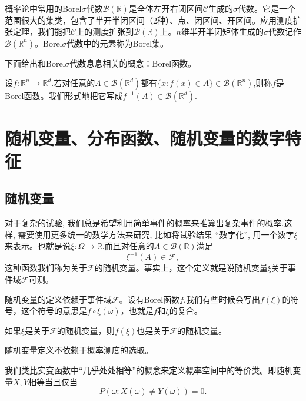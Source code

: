 \documentclass[lang=cn,10pt]{elegantbook}
\begin{document}
	概率论中常用的Borel\(\sigma\)代数\(\mathcal{B}(\mathbb{R})\)是全体左开右闭区间\(\mathcal{C}\)生成的\(\sigma\)代数。它是一个范围很大的集类，包含了半开半闭区间（2种）、点、闭区间、开区间。应用测度扩张定理，我们能把\(\mathcal{C}\)上的测度扩张到\(\mathcal{B}(\mathbb{R})\)上。\(n\)维半开半闭矩体生成的\(\sigma\)代数记作\(\mathcal{B}(\mathbb{R}^n)\)。Borel\(\sigma\)代数中的元素称为Borel集。
	
	下面给出和Borel\(\sigma\)代数息息相关的概念：Borel函数。
	\begin{definition}[Borel函数]
		设\(f:\mathbb{R}^n\to\mathbb{R}^d.\)若对任意的\(A\in\mathcal{B}(\mathbb{R}^d)\)都有\(\{x:f(x)\in A\}\in \mathcal{B}(\mathbb{R}^n)\),则称\(f\)是Borel函数。我们形式地把它写成\(f^{-1}(A)\in \mathcal{B}(\mathbb{R}^d)\).
	\end{definition}
	
	\section{随机变量、分布函数、随机变量的数字特征}
	\subsection{随机变量}
	对于复杂的试验, 我们总是希望利用简单事件的概率来推算出复杂事件的概率.这样, 需要使用更多统一的数学方法来研究, 比如将试验结果 “数字化”, 用一个数字\(\xi\)来表示。也就是说\(\xi:\Omega\to \mathbb{R.}\)而且对任意的\(A\in \mathcal{B}(\mathbb{R})\)满足
	\[\xi^{-1}(A)\in \mathcal{F},\]
	这种函数我们称为关于\(\mathcal{F}\)的随机变量。事实上，这个定义就是说随机变量\(\xi\)关于事件域\(\mathcal{F}\)可测。
	\begin{note}
		随机变量的定义依赖于事件域\(\mathcal{F}\)。设有Borel函数\(f\),我们有些时候会写出\(f(\xi)\)的符号，这个符号的意思是\(f\circ \xi (\omega)\)，也就是\(f\)和\(\xi\)的复合。
		
		如果\(\xi\)是关于\(\mathcal{F}\)的随机变量，则\(f(\xi)\)也是关于\(\mathcal{F}\)的随机变量。
		
		随机变量定义不依赖于概率测度的选取。
	\end{note}
	我们类比实变函数中“几乎处处相等”的概念来定义概率空间中的等价类。即随机变量\(X,Y\)相等当且仅当
	\[P(\omega:X(\omega)\ne Y(\omega))=0.\]
	
\end{document}
